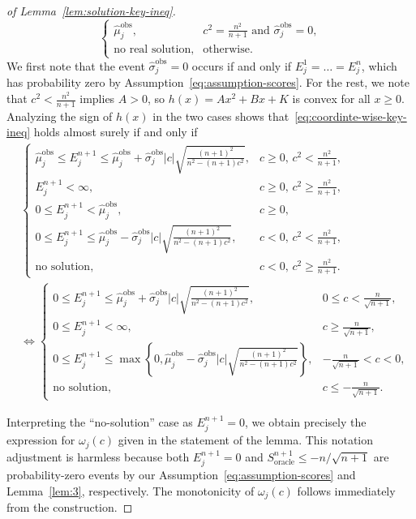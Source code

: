 \begin{proof}[of Lemma~\ref{lem:solution-key-ineq}]
\[\begin{cases}
    \hat{\mu}^\mathrm{obs}_j, & c^2 = \tfrac{n^2}{n+1} \text{ and } \hat{\sigma}^\mathrm{obs}_j = 0,\\
    \text{no real solution}, &\text{otherwise}.
\end{cases}
\]
We first note that the event $\hat{\sigma}^\mathrm{obs}_j = 0$ occurs if and only if $E^1_j=\ldots=E^n_j$, which has probability zero by Assumption~\ref{eq:assumption-scores}. For the rest, we note that $c^2 < \tfrac{n^2}{n+1}$ implies $A>0$, so $h(x) = Ax^2+Bx +K$ is convex for all $x \geq 0$.
Analyzing the sign of $h(x)$ in the two cases shows that~\eqref{eq:coordinte-wise-key-ineq} holds almost surely if and only if
\begin{align*}
    &\begin{cases}
    \hat{\mu}^\mathrm{obs}_j \leq E^{n+1}_j \leq \hat{\mu}^\mathrm{obs}_j+\hat{\sigma}^\mathrm{obs}_j|c|\sqrt{\tfrac{(n+1)^2}{n^2-(n+1)c^2}}, & c \geq 0,\, c^2 < \tfrac{n^2}{n+1}, \\[0.5em]
    E^{n+1}_j < \infty , & c \geq 0,\, c^2 \geq \tfrac{n^2}{n+1}, \\[0.5em]
    0 \leq E^{n+1}_j < \hat{\mu}^\mathrm{obs}_j, & c \geq 0, \\[0.5em]
    0\leq E^{n+1}_j \leq \hat{\mu}^\mathrm{obs}_j-\hat{\sigma}^\mathrm{obs}_j|c|\sqrt{\tfrac{(n+1)^2}{n^2-(n+1)c^2}}, & c < 0,\, c^2 < \tfrac{n^2}{n+1}, \\[0.5em]
    \text{no solution}, & c < 0,\, c^2 \geq \tfrac{n^2}{n+1}.
    \end{cases}\\
    &\iff \begin{cases}
    0 \leq E^{n+1}_j \leq \hat{\mu}^\mathrm{obs}_j+\hat{\sigma}^\mathrm{obs}_j|c|\sqrt{\tfrac{(n+1)^2}{n^2-(n+1)c^2}}, & 0\leq c < \tfrac{n}{\sqrt{n+1}}, \\[0.5em]
    0\leq E^{n+1}_j < \infty , & c\geq\tfrac{n}{\sqrt{n+1}}, \\[0.5em]
    0\leq E^{n+1}_j \leq \max\left\{0, \hat{\mu}^\mathrm{obs}_j-\hat{\sigma}^\mathrm{obs}_j|c|\sqrt{\tfrac{(n+1)^2}{n^2-(n+1)c^2}}\right\}, & -\tfrac{n}{\sqrt{n+1}} < c<0, \\[0.5em]
    \text{no solution}, & c \leq - \tfrac{n}{\sqrt{n+1}}.
    \end{cases}
\end{align*}

Interpreting the ``no-solution'' case as $E^{n+1}_j = 0$, we obtain precisely the expression for $\omega_j(c)$ given in the statement of the lemma. This notation adjustment is harmless because both $E^{n+1}_j = 0$ and $S^{n+1}_{\mathrm{oracle}} \leq -n/\sqrt{n+1}$ are probability-zero events by our Assumption~\ref{eq:assumption-scores} and Lemma~\ref{lem:3}, respectively.
The monotonicity of $\omega_j(c)$ follows immediately from the construction.
\end{proof}

